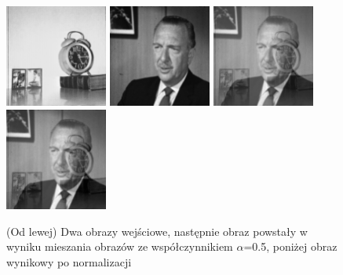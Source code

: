 \documentclass[final,a4paper,openany,12pt]{mwbk}
\begin{document}
\begin{figure}[H]
	\begin{center}
		\includegraphics[width=0.3\textwidth]{1/1Gray_Img1_Mix_Original}
		\includegraphics[width=0.3\textwidth]{1/1Gray_Img2_Mix_Original}
		\includegraphics[width=0.3\textwidth]{1/1Gray_Img_Mix_Result}
		\includegraphics[width=0.3\textwidth]{1/1Gray_Img_Mix_Result_Norm}
	\end{center}
	\caption{(Od lewej) Dwa obrazy wejściowe, następnie obraz powstały w wyniku mieszania obrazów ze współczynnikiem $\alpha$=0.5, poniżej obraz wynikowy po normalizacji }
\end{figure}
\end{document}
